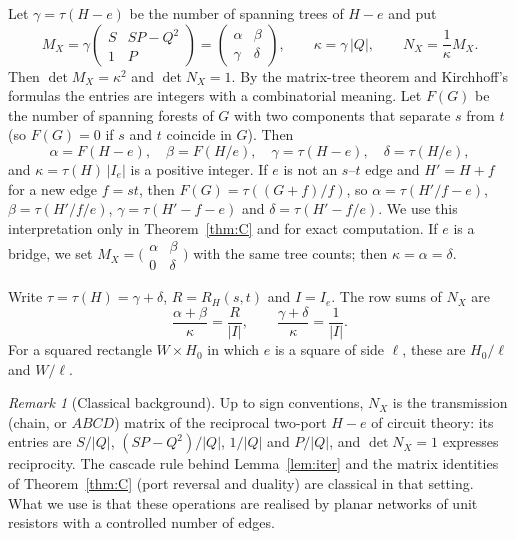 \documentclass[11pt]{amsart}
\theoremstyle{plain}
\theoremstyle{definition}
\theoremstyle{remark}
\newtheorem{remark}{Remark}
\begin{document}
Let $\gamma=\tau(H-e)$ be the number of spanning trees of $H-e$ and put
\[
M_X=\gamma\begin{pmatrix}S& SP-Q^2\\ 1& P\end{pmatrix}=\begin{pmatrix}\alpha&\beta\\ \gamma&\delta\end{pmatrix},
\qquad \kappa=\gamma\,|Q| ,\qquad N_X=\frac1\kappa M_X .
\]
Then $\det M_X=\kappa^2$ and $\det N_X=1$. By the matrix-tree theorem and Kirchhoff's formulas the entries are
integers with a combinatorial meaning. Let $F(G)$ be the number of spanning forests of $G$ with two components
that separate $s$ from $t$ (so $F(G)=0$ if $s$ and $t$ coincide in $G$). Then
\[
\alpha=F(H-e),\quad \beta=F(H/e),\quad \gamma=\tau(H-e),\quad \delta=\tau(H/e),
\]
and $\kappa=\tau(H)\,|I_e|$ is a positive integer. If $e$ is not an $s$--$t$ edge and $H'=H+f$ for a new edge
$f=st$, then $F(G)=\tau((G+f)/f)$, so $\alpha=\tau(H'/f-e)$, $\beta=\tau(H'/f/e)$, $\gamma=\tau(H'-f-e)$ and
$\delta=\tau(H'-f/e)$. We use this interpretation only in Theorem~\ref{thm:C} and for
exact computation. If $e$ is a bridge, we set $M_X=\bigl(\begin{smallmatrix}\alpha&\beta\\0&\delta\end{smallmatrix}\bigr)$
with the same tree counts; then $\kappa=\alpha=\delta$.

Write $\tau=\tau(H)=\gamma+\delta$, $R=R_H(s,t)$ and $I=I_e$. The row sums of $N_X$ are
\begin{equation}\label{eq:rows}
\frac{\alpha+\beta}{\kappa}=\frac{R}{|I|},\qquad\frac{\gamma+\delta}{\kappa}=\frac1{|I|} .
\end{equation}
For a squared rectangle $W\times H_0$ in which $e$ is a square of side $\ell$, these are $H_0/\ell$ and
$W/\ell$.

\begin{remark}[Classical background]
Up to sign conventions, $N_X$ is the transmission (chain, or $ABCD$) matrix of the reciprocal two-port $H-e$ of
circuit theory: its entries are $S/|Q|$, $(SP-Q^2)/|Q|$, $1/|Q|$ and $P/|Q|$, and $\det N_X=1$ expresses
reciprocity. The cascade rule behind Lemma~\ref{lem:iter} and the matrix identities of Theorem~\ref{thm:C} (port
reversal and duality) are classical in that setting. What we use is that these operations are realised by planar
networks of unit resistors with a controlled number of edges.
\end{remark}
\end{document}

